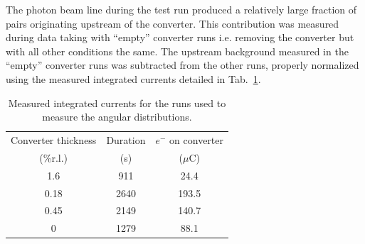 The photon beam line during the test run produced a relatively large fraction of pairs 
originating upstream of the converter. This contribution was measured during data taking 
with ``empty'' converter runs i.e. removing the converter but with all other conditions 
the same. The upstream background measured in the ``empty'' converter runs was subtracted 
from the other runs, properly normalized using the measured integrated currents detailed in 
Tab.~\ref{tab:currents}.
\begin{table}
\centering
\begin{tabular}{|c|c|c|}
\hline
Converter thickness & Duration &  $e^-$ on converter \\
 (\%r.l.) & (s) & ($\mu$C)    \\   
\hline
1.6   & 911 &     24.4     \\
0.18   & 2640 &    193.5  \\
0.45  & 2149 &       140.7  \\
0    & 1279  &   88.1  \\
\hline
\end{tabular}
\caption{{\small Measured integrated currents for the runs used to measure the angular distributions.}}
\label{tab:currents}
\end{table}
